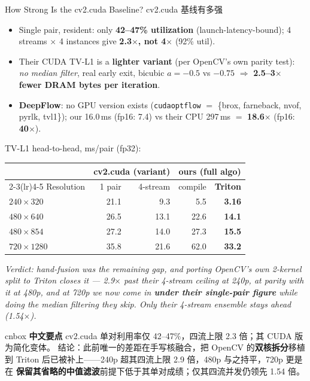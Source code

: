 \documentclass[aspectratio=169,10pt]{beamer}
\newcommand{\zh}[1]{{\zhfont #1}}
\newenvironment{cn}{%
  \begin{beamercolorbox}[rounded=true,sep=4pt,wd=\textwidth]{cnbox}\zhfont\footnotesize
  {\color{cblue!70!black}\textbf{中文要点}}\quad}%
  {\end{beamercolorbox}}
\begin{document}
\begin{frame}{How Strong Is the cv2.cuda Baseline? \zh{cv2.cuda 基线有多强}}
  \begin{itemize}\itemsep1pt\footnotesize
    \item Single pair, resident: only \textbf{42--47\% utilization}
      (launch-latency-bound); 4 streams $\times$ 4 instances give
      \textbf{2.3$\times$, not 4$\times$} (92\% util).
    \item Their CUDA TV-L1 is a \textbf{lighter variant} (per OpenCV's own
      parity test): \emph{no median filter}, real early exit, bicubic
      $a{=}{-}0.5$ vs $-0.75$ $\Rightarrow$ \textbf{2.5--3$\times$ fewer DRAM
      bytes per iteration}.
    \item \textbf{DeepFlow}: no GPU version exists
      (\texttt{cudaoptflow} $=$ \{brox, farneback, nvof, pyrlk, tvl1\});
      our 16.0\,ms (fp16: 7.4) vs their CPU 297\,ms $=$
      \textbf{18.6$\times$} (fp16: \textbf{40$\times$}).
  \end{itemize}
  \centering
  {\footnotesize TV-L1 head-to-head, ms/pair (fp32):\quad
  \begin{tabular}{@{}lrrrr@{}}
    \toprule
    & \multicolumn{2}{c}{cv2.cuda (variant)} & \multicolumn{2}{c}{ours (full algo)} \\
    \cmidrule(lr){2-3}\cmidrule(lr){4-5}
    Resolution & 1 pair & 4-stream & compile & \textbf{Triton} \\
    \midrule
    $240{\times}320$  & 21.1 & 9.3  & 5.5  & \textbf{3.16} \\
    $480{\times}640$  & 26.5 & 13.1 & 22.6 & \textbf{14.1} \\
    $480{\times}854$  & 27.2 & 14.0 & 27.3 & \textbf{15.5} \\
    $720{\times}1280$ & 35.8 & 21.6 & 62.0 & \textbf{33.2} \\
    \bottomrule
  \end{tabular}}
  \par\smallskip
  {\footnotesize\itshape Verdict: hand-fusion was the remaining gap, and
   porting OpenCV's own 2-kernel split to Triton closes it --- 2.9$\times$
   past their 4-stream ceiling at 240p, at parity with it at 480p, and at
   720p we now come in \textbf{under their single-pair figure} while doing the
   median filtering they skip. Only their 4-stream ensemble stays ahead
   (1.54$\times$).}
  \vfill
  \begin{cn}
    cv2.cuda 单对利用率仅 42--47\%，四流上限 2.3 倍；其 CUDA 版为简化变体。
    结论：此前唯一的差距在手写核融合，把 OpenCV 的\textbf{双核拆分}移植到
    Triton 后已被补上——240p 超其四流上限 2.9 倍，480p 与之持平，720p 更是在
    \textbf{保留其省略的中值滤波}前提下低于其单对成绩；仅其四流并发仍领先
    1.54 倍。
  \end{cn}
\end{frame}
\end{document}
